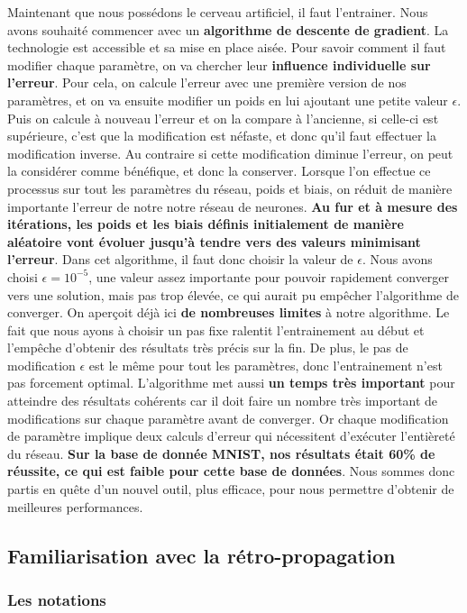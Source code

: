 \documentclass[12pt,a4paper]{extarticle}
\begin{document}
Maintenant que nous possédons le cerveau artificiel, il faut l'entrainer. Nous avons souhaité commencer avec un \textbf{algorithme de descente de gradient}. La technologie est accessible et sa mise en place aisée. Pour savoir comment il faut modifier chaque paramètre, on va chercher leur \textbf{influence individuelle sur l'erreur}. Pour cela, on calcule l'erreur avec une première version de nos paramètres, et on va ensuite modifier un poids en lui ajoutant une petite valeur $\epsilon$. Puis on calcule à nouveau l'erreur et on la compare à l'ancienne, si celle-ci est supérieure, c'est que la modification est néfaste, et donc qu'il faut effectuer la modification inverse. Au contraire si cette modification diminue l'erreur, on peut la considérer comme bénéfique, et donc la conserver. Lorsque l'on effectue ce processus sur tout les paramètres du réseau, poids et biais, on réduit de manière importante l'erreur de notre notre réseau de neurones.\textbf{ Au fur et à mesure des itérations, les poids et les biais définis initialement de manière aléatoire vont évoluer jusqu'à tendre vers des valeurs minimisant l'erreur}. Dans cet algorithme, il faut donc choisir la valeur de $\epsilon$. Nous avons choisi $\epsilon = 10^{-5}$, une valeur assez importante pour pouvoir rapidement converger vers une solution, mais pas trop élevée, ce qui aurait pu empêcher l'algorithme de converger. On aperçoit déjà ici \textbf{de nombreuses limites} à notre algorithme. Le fait que nous ayons à choisir un pas fixe ralentit l'entrainement au début et l'empêche d'obtenir des résultats très précis sur la fin. De plus, le pas de modification $\epsilon$ est le même pour tout les paramètres, donc l'entrainement n'est pas forcement optimal. L'algorithme met aussi \textbf{un temps très important} pour atteindre des résultats cohérents car il doit faire un nombre très important de modifications sur chaque paramètre avant de converger. Or chaque modification de paramètre implique deux calculs d'erreur qui nécessitent d'exécuter l'entièreté du réseau. \textbf{Sur la base de donnée MNIST, nos résultats était 60\% de réussite, ce qui est faible pour cette base de données}. Nous sommes donc partis en quête d'un nouvel outil, plus efficace, pour nous permettre d'obtenir de meilleures performances.

\subsection{Familiarisation avec la rétro-propagation}

\subsubsection{Les notations}
\end{document}
